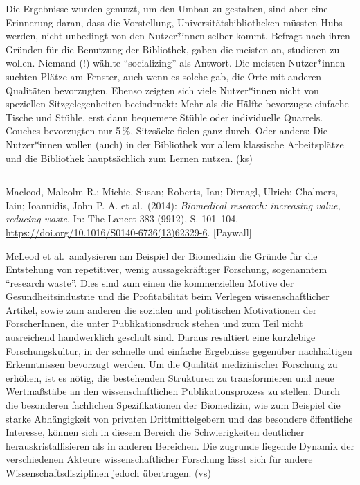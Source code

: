 \documentclass[a4paper,
fontsize=11pt,
oneside,
numbers=noperiodatend,
parskip=half-,
bibliography=totoc,
final
]{scrartcl}
\begin{document}
Die Ergebnisse wurden genutzt, um den Umbau zu gestalten, sind aber eine
Erinnerung daran, dass die Vorstellung, Universitätsbibliotheken müssten
Hubs werden, nicht unbedingt von den Nutzer*innen selber kommt. Befragt
nach ihren Gründen für die Benutzung der Bibliothek, gaben die meisten
an, studieren zu wollen. Niemand (!) wählte \enquote{socializing} als
Antwort. Die meisten Nutzer*innen suchten Plätze am Fenster, auch wenn
es solche gab, die Orte mit anderen Qualitäten bevorzugten. Ebenso
zeigten sich viele Nutzer*innen nicht von speziellen Sitzgelegenheiten
beeindruckt: Mehr als die Hälfte bevorzugte einfache Tische und Stühle,
erst dann bequemere Stühle oder individuelle Quarrels. Couches
bevorzugten nur 5\,\%, Sitzsäcke fielen ganz durch. Oder anders: Die
Nutzer*innen wollen (auch) in der Bibliothek vor allem klassische
Arbeitsplätze und die Bibliothek hauptsächlich zum Lernen nutzen. (ks)

\begin{center}\rule{0.5\linewidth}{0.5pt}\end{center}

Macleod, Malcolm R.; Michie, Susan; Roberts, Ian; Dirnagl, Ulrich;
Chalmers, Iain; Ioannidis, John P. A. et al.~(2014): \emph{Biomedical
research: increasing value, reducing waste}. In: The Lancet 383 (9912),
S. 101--104. \url{https://doi.org/10.1016/S0140-6736(13)62329-6}.
{[}Paywall{]}

McLeod et al.~analysieren am Beispiel der Biomedizin die Gründe für die
Entstehung von repetitiver, wenig aussagekräftiger Forschung,
sogenanntem \enquote{research waste}. Dies sind zum einen die
kommerziellen Motive der Gesundheitsindustrie und die Profitabilität
beim Verlegen wissenschaftlicher Artikel, sowie zum anderen die sozialen
und politischen Motivationen der ForscherInnen, die unter
Publikationsdruck stehen und zum Teil nicht ausreichend handwerklich
geschult sind. Daraus resultiert eine kurzlebige Forschungskultur, in
der schnelle und einfache Ergebnisse gegenüber nachhaltigen
Erkenntnissen bevorzugt werden. Um die Qualität medizinischer Forschung
zu erhöhen, ist es nötig, die bestehenden Strukturen zu transformieren
und neue Wertmaßstäbe an den wissenschaftlichen Publikationsprozess zu
stellen. Durch die besonderen fachlichen Spezifikationen der Biomedizin,
wie zum Beispiel die starke Abhängigkeit von privaten Drittmittelgebern
und das besondere öffentliche Interesse, können sich in diesem Bereich
die Schwierigkeiten deutlicher herauskristallisieren als in anderen
Bereichen. Die zugrunde liegende Dynamik der verschiedenen Akteure
wissenschaftlicher Forschung lässt sich für andere
Wissenschaftsdisziplinen jedoch übertragen. (vs)
\end{document}
